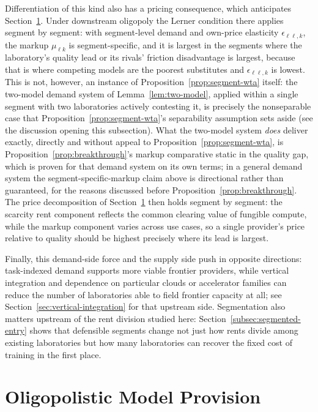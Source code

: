 \documentclass[11pt]{article}
\begin{document}
Differentiation of this kind also has a pricing consequence, which anticipates Section~\ref{sec:oligopoly}. Under downstream oligopoly the Lerner condition there applies segment by segment: with segment-level demand and own-price elasticity $\epsilon_{\ell\ell,k}$, the markup $\mu_{\ell k}$ is segment-specific, and it is largest in the segments where the laboratory's quality lead or its rivals' friction disadvantage is largest, because that is where competing models are the poorest substitutes and $\epsilon_{\ell\ell,k}$ is lowest. This is not, however, an instance of Proposition~\ref{prop:segment-wta} itself: the two-model demand system of Lemma~\ref{lem:two-model}, applied within a single segment with two laboratories actively contesting it, is precisely the nonseparable case that Proposition~\ref{prop:segment-wta}'s separability assumption sets aside (see the discussion opening this subsection). What the two-model system \emph{does} deliver exactly, directly and without appeal to Proposition~\ref{prop:segment-wta}, is Proposition~\ref{prop:breakthrough}'s markup comparative static in the quality gap, which is proven for that demand system on its own terms; in a general demand system the segment-specific-markup claim above is directional rather than guaranteed, for the reasons discussed before Proposition~\ref{prop:breakthrough}. The price decomposition of Section~\ref{sec:oligopoly} then holds segment by segment: the scarcity rent component reflects the common clearing value of fungible compute, while the markup component varies across use cases, so a single provider's price relative to quality should be highest precisely where its lead is largest.

Finally, this demand-side force and the supply side push in opposite directions: task-indexed demand supports more viable frontier providers, while vertical integration and dependence on particular clouds or accelerator families can reduce the number of laboratories able to field frontier capacity at all; see Section~\ref{sec:vertical-integration} for that upstream side. Segmentation also matters upstream of the rent division studied here: Section~\ref{subsec:segmented-entry} shows that defensible segments change not just how rents divide among existing laboratories but how many laboratories can recover the fixed cost of training in the first place.

\section{Oligopolistic Model Provision}
\label{sec:oligopoly}
\end{document}
